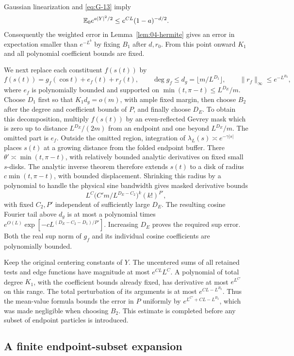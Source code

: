 Gaussian linearization and \eqref{eq:G-13} imply
\[
 \mathbb E_0e^{a|Y|^2/2}\le e^{CL}(1-a)^{-d/2}.
\]
Consequently the weighted error in Lemma~\ref{lem:04-hermite} gives
an error in expectation smaller than \(e^{-L^b}\) by fixing \(B_1\)
after \(d,r_0\). From this point onward \(K_1\) and all polynomial
coefficient bounds are fixed.

We next replace each constituent \(f(s(t))\) by
\[
 f(s(t))=g_f(\cos t)+e_f(t)+r_f(t),\qquad
 \deg g_f\le d_g=\lfloor m/L^{D_1}\rfloor,
 \qquad \|r_f\|_\infty\le e^{-L^{B_2}},
\]
where \(e_f\) is polynomially bounded and supported on
\(\min(t,\pi-t)\le L^{D_E}/m\). Choose \(D_1\) first so that
\(K_1d_g=o(m)\), with ample fixed margin, then choose \(B_2\) after
the degree and coefficient bounds of \(P\), and finally choose
\(D_E\).
To obtain this decomposition, multiply \(f(s(t))\) by an even-reflected
Gevrey mask which is zero up to distance \(L^{D_E}/(2m)\) from an
endpoint and one beyond \(L^{D_E}/m\). The omitted part is \(e_f\).
Outside the omitted region, integration of
\(\lambda_L(s)\asymp e^{-\gamma|s|}\) places \(s(t)\) at a growing
distance from the folded endpoint buffer. There \(\theta'\asymp
\min(t,\pi-t)\), with relatively bounded analytic derivatives on
fixed small \(s\)-disks. The analytic inverse theorem therefore
extends \(s(t)\) to a disk of radius
\(c\min(t,\pi-t)\), with bounded displacement. Shrinking this radius
by a polynomial to handle the physical sine bandwidth gives masked
derivative bounds
\[
 L^C\big(C'm/L^{D_E-C_2}\big)^k(k!)^{P'},
\]
with fixed \(C_2,P'\) independent of sufficiently large \(D_E\).
The resulting cosine Fourier tail above \(d_g\) is at most a
polynomial times
\(e^{O(L)}\exp[-cL^{(D_E-C_2-D_1)/P'}]\). Increasing \(D_E\)
proves the required sup error. Both the real sup norm of \(g_f\)
and its individual cosine coefficients are polynomially bounded.

Keep the original centering constants of \(Y\). The uncentered sums
of all retained tests and edge functions have magnitude at most
\(e^{CL}L^C\). A polynomial of total degree \(K_1\), with the
coefficient bounds already fixed, has derivative at most
\(e^{L^{C'}}\) on this range. The total perturbation of its arguments
is at most \(e^{CL-L^{B_2}}\). Thus the mean-value formula bounds
the error in \(P\) uniformly by
\(e^{L^{C'}+CL-L^{B_2}}\), which was made negligible when choosing
\(B_2\). This estimate is completed before any subset of endpoint
particles is introduced.

\subsection{A finite endpoint-subset expansion}

